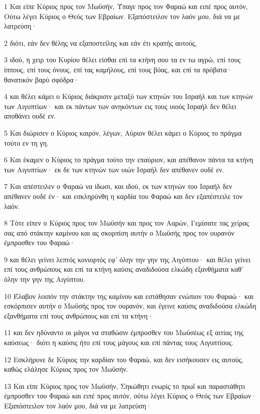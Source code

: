 \par 1 Και είπε Κύριος προς τον Μωϋσήν, Ύπαγε προς τον Φαραώ και ειπέ προς αυτόν, Ούτω λέγει Κύριος ο Θεός των Εβραίων. Εξαπόστειλον τον λαόν μου, διά να με λατρεύση·
\par 2 διότι, εάν δεν θέλης να εξαποστείλης και εάν έτι κρατής αυτούς,
\par 3 ιδού, η χειρ του Κυρίου θέλει είσθαι επί τα κτήνη σου τα εν τω αγρώ, επί τους ίππους, επί τους όνους, επί τας καμήλους, επί τους βόας, και επί τα πρόβατα· θανατικόν βαρύ σφόδρα·
\par 4 και θέλει κάμει ο Κύριος διάκρισιν μεταξύ των κτηνών του Ισραήλ και των κτηνών των Αιγυπτίων· και εκ πάντων των ανηκόντων εις τους υιούς Ισραήλ δεν θέλει αποθάνει ουδέ εν.
\par 5 Και διώρισεν ο Κύριος καιρόν, λέγων, Αύριον θέλει κάμει ο Κύριος το πράγμα τούτο εν τη γη.
\par 6 Και έκαμεν ο Κύριος το πράγμα τούτο την επαύριον, και απέθανον πάντα τα κτήνη των Αιγυπτίων· εκ δε των κτηνών των υιών Ισραήλ δεν απέθανεν ουδέ εν.
\par 7 Και απέστειλεν ο Φαραώ να ίδωσι, και ιδού, εκ των κτηνών του Ισραήλ δεν απέθανεν ουδέ έν· και εσκληρύνθη η καρδία του Φαραώ και δεν εξαπέστειλε τον λαόν.
\par 8 Τότε είπεν ο Κύριος προς τον Μωϋσήν και προς τον Ααρών, Γεμίσατε τας χείρας σας από στάκτην καμίνου και ας σκορπίση αυτήν ο Μωϋσής προς τον ουρανόν έμπροσθεν του Φαραώ·
\par 9 και θέλει γείνει λεπτός κονιορτός εφ' όλην την γην της Αιγύπτου· και θέλει γείνει επί τους ανθρώπους και επί τα κτήνη καύσις αναδιδούσα ελκώδη εξανθήματα καθ' όλην την γην της Αιγύπτου.
\par 10 Έλαβον λοιπόν την στάκτην της καμίνου και εστάθησαν ενώπιον του Φαραώ· και εσκόρπισεν αυτήν ο Μωϋσής προς τον ουρανόν, και έγεινε καύσις αναδιδούσα ελκώδη εξανθήματα επί τους ανθρώπους και επί τα κτήνη·
\par 11 και δεν ηδύναντο οι μάγοι να σταθώσιν έμπροσθεν του Μωϋσέως εξ αιτίας της καύσεως· διότι η καύσις ήτο επί τους μάγους και επί πάντας τους Αιγυπτίους.
\par 12 Εσκλήρυνε δε Κύριος την καρδίαν του Φαραώ, και δεν εισήκουσεν εις αυτούς, καθώς ελάλησε Κύριος προς τον Μωϋσήν.
\par 13 Και είπε Κύριος προς τον Μωϋσήν, Σηκώθητι ενωρίς το πρωΐ και παραστάθητι έμπροσθεν του Φαραώ και ειπέ προς αυτόν, ούτω λέγει Κύριος ο Θεός των Εβραίων· Εξαπόστειλον τον λαόν μου, διά να με λατρεύση·

